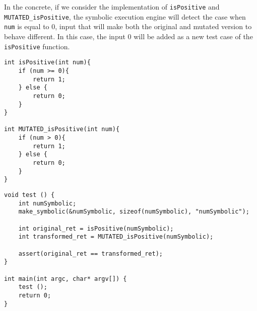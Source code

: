In the concrete, if we consider the implementation of \texttt{isPositive} and \texttt{MUTATED\_isPositive}, the symbolic execution engine will detect the case when \texttt{num} is equal to 0, input that will make both the original and mutated version to behave different. In this case, the input 0 will be added as a new test case of the \texttt{isPositive} function.

\begin{lstlisting}[style=CStyle, caption=isPositive and MUTATED\_isPositive functions, label=function]
int isPositive(int num){
	if (num >= 0){
		return 1;
	} else {
		return 0;
	}
}

int MUTATED_isPositive(int num){
	if (num > 0){
		return 1;
	} else {
		return 0;
	}
}

\end{lstlisting}

\begin{lstlisting}[style=CStyle, caption=Example, label=example]
void test () { 
	int numSymbolic; 
	make_symbolic(&numSymbolic, sizeof(numSymbolic), "numSymbolic"); 
 	
 	int original_ret = isPositive(numSymbolic); 
	int transformed_ret = MUTATED_isPositive(numSymbolic); 
 
	assert(original_ret == transformed_ret); 
} 
 
int main(int argc, char* argv[]) { 
	test (); 
	return 0; 
}
\end{lstlisting}


\endinput

\subsubsection{Symbolic execution test generation} %

These methods turn each of the RIPR conditions into a constraint and build a system that is passed to a constraint solver (critical).

